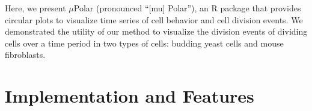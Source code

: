 \documentclass[conference]{IEEEtran}
\begin{document}
Here, we present $\mu$Polar (pronounced ``[mu] Polar''),
an R package that provides circular plots to visualize time series of cell behavior and cell division events.
We demonstrated the utility of our method to visualize the division events of dividing cells over a time period in two types of cells: budding yeast cells and mouse fibroblasts. 


 
 
 
 
 

\section{Implementation and Features}
\end{document}
